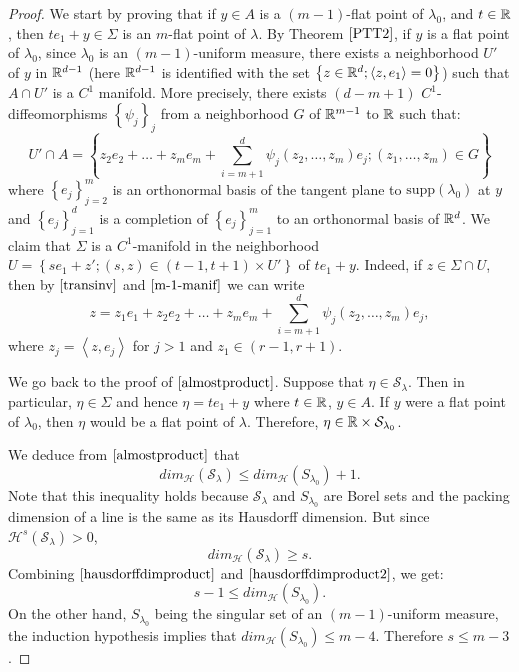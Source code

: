 \documentclass[11pt]{article}
\theoremstyle{definition}
\theoremstyle{remark}
\numberwithin{equation}{section}
\begin{document}
\begin{proof}
We start by proving that if $y \in A $ is a $(m-1)$-flat point of $\lambda_0$, and $t \in \mathbb{R}$, then  $te_1+y \in \Sigma$ is an $m$-flat point of $\lambda$.
By Theorem $\ref{PTT2}$, if $y$ is a flat point of $\lambda_0$, since $\lambda_0$ is an $(m-1)$-uniform measure, there exists a neighborhood $U'$ of $y$ in $\mathbb{R}^{d-1}$ (here $\mathbb{R}^{d-1}$ is identified with the set $\left\lbrace z \in \mathbb{R}^{d} ; \left\langle z  , e_1 \right\rangle = 0 \right\rbrace$) such that $A \cap U'$ is a $C^{1}$ manifold.
More precisely, there exists $(d-m+1)$ $C^1$- diffeomorphisms $\left\lbrace\psi_j \right\rbrace_{j}$  from a neighborhood $G$ of $\mathbb{R}^{m-1}$ to $\mathbb{R}$ such that:
\begin{equation}\label{m-1-manif}
U' \cap A = \left\lbrace z_2 e_2 + \ldots + z_m e_m + \sum_{i=m+1}^{d} \psi_j(z_2,\ldots, z_m) e_j ; (z_1, \ldots, z_m) \in G \right\rbrace
\end{equation}
where $\left\lbrace e_j \right\rbrace _{j=2}^{m}$ is an orthonormal basis of the tangent plane to $\mbox{supp}(\lambda_{0})$ at $y$ and $\left\lbrace e_j \right\rbrace _{j=1}^{d}$ is a completion of $\left\lbrace e_j \right\rbrace _{j=1}^{m}$ to an orthonormal basis of $\mathbb{R}^{d}$.
 We claim that $\Sigma$ is a $C^{1}$-manifold in the neighborhood $U=\left\lbrace se_1+ z'; (s,z) \in (t-1, t+1) \times U'\right\rbrace$ of $te_1 + y$. Indeed, if $z \in \Sigma \cap U$, then by $\eqref{transinv}$ and $\eqref{m-1-manif}$ we can write 
\begin{equation}\label{m-manifold}
 z= z_1 e_1 + z_2 e_2 + \ldots + z_m e_m + \sum_{i=m+1}^{d} \psi_j(z_2,\ldots, z_m)e_j, 
\end{equation}
where $z_j = \left\langle z,e_j \right\rangle$ for $j>1$ and $z_1 \in (r-1,r+1)$.

We go back to the proof of $\eqref{almostproduct}$. Suppose that $\eta \in \mathcal{S}_{\lambda}$. Then in particular, $\eta \in \Sigma$ and hence $\eta= te_1+y$ where $t \in \mathbb{R}$, $y \in A$. If $y$ were a flat point of $\lambda_0$, then $\eta$ would be a flat point of $\lambda$. Therefore, $\eta \in \mathbb{R} \times \mathcal{S}_{\lambda_0}$.

We deduce from $\eqref{almostproduct}$ that 
\begin{equation} \label{hausdorffdimproduct}
dim_{\mathcal{H}}(\mathcal{S}_{\lambda}) \leq dim_{\mathcal{H}}(S_{\lambda_0}) + 1.
\end{equation} 
Note that this inequality holds because $\mathcal{S}_{\lambda}$ and $S_{\lambda_0}$ are Borel sets and the packing dimension of a line is the same as its Hausdorff dimension.
But since $\mathcal{H}^{s}(\mathcal{S}_{\lambda})>0$, 
\begin{equation} \label{hausdorffdimproduct2}
dim_{\mathcal{H}}(\mathcal{S}_{\lambda}) \geq s. 
\end{equation} 
Combining $\eqref{hausdorffdimproduct}$ and $\eqref{hausdorffdimproduct2}$, we get:
\begin{equation}
s-1 \leq dim_{\mathcal{H}}(S_{\lambda_0}).
\end{equation}
On the other hand, $S_{\lambda_0}$ being the singular set of an $(m-1)$-uniform measure, the induction hypothesis implies that $dim_{\mathcal{H}}(S_{\lambda_0}) \leq m-4$. Therefore $s \leq m-3$.


\end{proof}
\end{document}
